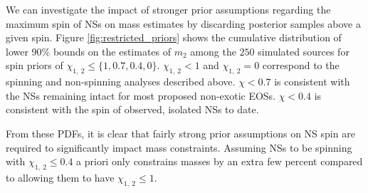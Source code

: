 We can investigate the impact of stronger prior assumptions regarding the maximum spin of NSs on mass estimates by discarding posterior samples above a given spin.  Figure \ref{fig:restricted_priors} shows the cumulative distribution of lower $90\%$ bounds on the estimates of $m_2$ among the $250$ simulated sources for spin priors of $\chi_{1,~2} \leq \{1, 0.7, 0.4, 0\}$.  $\chi_{1,~2}<1$ and $\chi_{1,~2}=0$ correspond to the spinning and non-spinning analyses described above.  $\chi<0.7$ is consistent with the NSs remaining intact for most proposed non-exotic EOSs.  $\chi<0.4$ is consistent with the spin of observed, isolated NSs to date.

From these PDFs, it is clear that fairly strong prior assumptions on NS spin are required to significantly impact mass constraints. Assuming NSs to be spinning with $\chi_{1,~2}\leq 0.4$ a priori only constrains masses by an extra few percent compared to allowing them to have $\chi_{1,~2} \leq 1$.